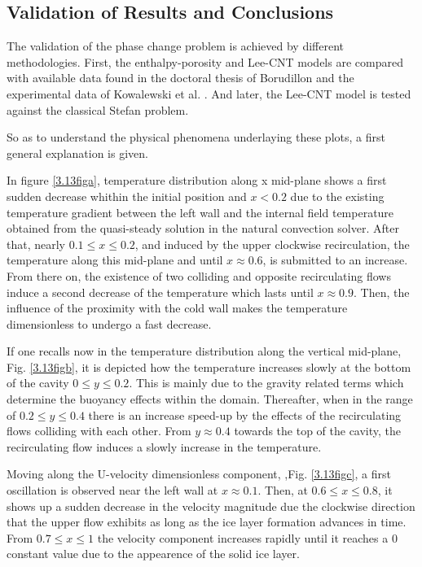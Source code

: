 \subsection{Validation of Results and Conclusions}
\label{Convection-case}
\setlength{\parindent}{0.5cm} The validation of the phase change problem is achieved by different methodologies. First, the enthalpy-porosity and Lee-CNT models are compared with available data found in the doctoral thesis of Borudillon \cite{bourdillon_2016} and the experimental data of Kowalewski et al. \cite{kowalewski_rebow_1999}. And later, the Lee-CNT model is tested against the classical Stefan problem.

\noindent So as to understand the physical phenomena underlaying these plots, a first general explanation is given. 

\noindent In figure \ref{3.13figa}, temperature distribution along x mid-plane shows a first sudden decrease whithin the initial position and $x < 0.2$ due to the existing temperature gradient between the left wall and the internal field temperature obtained from the quasi-steady solution in the natural convection solver. After that, nearly $0.1 \leq x \leq 0.2$, and induced by the upper clockwise recirculation, the temperature along this mid-plane and until $x \approx 0.6$, is submitted to an increase. From there on, the existence of two colliding and opposite recirculating flows induce a second decrease of the temperature which lasts until $x \approx 0.9$. Then, the influence of the proximity with the cold wall makes the temperature dimensionless to undergo a fast decrease.

\noindent If one recalls now in the temperature distribution along the vertical mid-plane, Fig. \ref{3.13figb}, it is depicted how the temperature increases slowly at the bottom of the cavity $0 \leq y \leq 0.2$. This is mainly due to the gravity related terms which determine the buoyancy effects within the domain. Thereafter, when in the range of $0.2 \leq y \leq 0.4$ there is an increase speed-up by the effects of the recirculating flows colliding with each other. From $y \approx 0.4$ towards the top of the cavity, the recirculating flow induces a slowly increase in the temperature.

\noindent Moving along the U-velocity dimensionless component, ,Fig. \ref{3.13figc}, a first oscillation is observed near the left wall at $x \approx 0.1$. Then, at $0.6 \leq x \leq 0.8$, it shows up a sudden decrease in the velocity magnitude due the clockwise direction that the upper flow exhibits as long as the ice layer formation advances in time. From $0.7 \leq x \leq 1$ the velocity component increases rapidly until it reaches a 0 constant value due to the appearence of the solid ice layer. 

